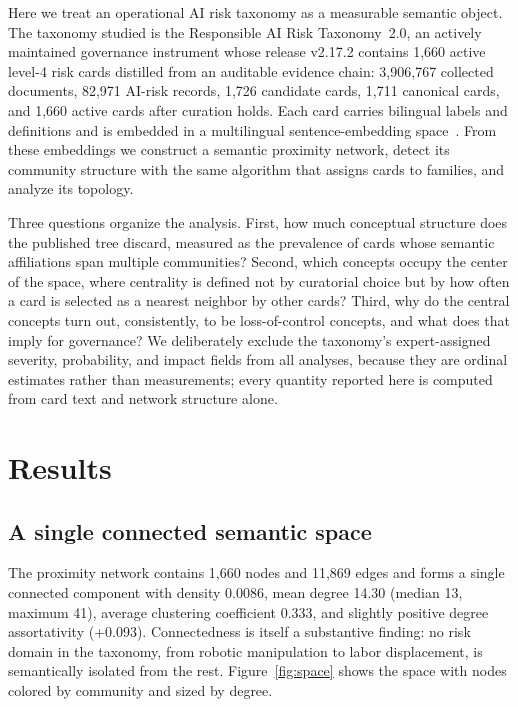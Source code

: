 \documentclass[11pt,a4paper]{article}
\begin{document}
Here we treat an operational AI risk taxonomy as a measurable semantic object. The taxonomy studied is the Responsible AI Risk Taxonomy~2.0, an actively maintained governance instrument whose release v2.17.2 contains 1,660 active level-4 risk cards distilled from an auditable evidence chain: 3,906,767 collected documents, 82,971 AI-risk records, 1,726 candidate cards, 1,711 canonical cards, and 1,660 active cards after curation holds. Each card carries bilingual labels and definitions and is embedded in a multilingual sentence-embedding space~\cite{chen2024}. From these embeddings we construct a semantic proximity network, detect its community structure with the same algorithm that assigns cards to families, and analyze its topology.

Three questions organize the analysis. First, how much conceptual structure does the published tree discard, measured as the prevalence of cards whose semantic affiliations span multiple communities? Second, which concepts occupy the center of the space, where centrality is defined not by curatorial choice but by how often a card is selected as a nearest neighbor by other cards? Third, why do the central concepts turn out, consistently, to be loss-of-control concepts, and what does that imply for governance? We deliberately exclude the taxonomy's expert-assigned severity, probability, and impact fields from all analyses, because they are ordinal estimates rather than measurements; every quantity reported here is computed from card text and network structure alone.

\section*{Results}

\subsection*{A single connected semantic space}

The proximity network contains 1,660 nodes and 11,869 edges and forms a single connected component with density 0.0086, mean degree 14.30 (median 13, maximum 41), average clustering coefficient 0.333, and slightly positive degree assortativity (+0.093). Connectedness is itself a substantive finding: no risk domain in the taxonomy, from robotic manipulation to labor displacement, is semantically isolated from the rest. Figure~\ref{fig:space} shows the space with nodes colored by community and sized by degree.
\end{document}

